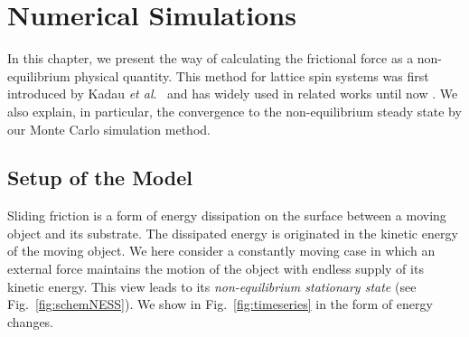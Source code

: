 \chapter{Numerical Simulations}\label{chap:NumSim}

In this chapter, we present the way of calculating the frictional force as a non-equilibrium physical quantity. This method for lattice spin systems was first introduced by Kadau \textit{et al}.\ \cite{Kadau2008} and has widely used in related works until now \cite{Hucht2009b,Magiera2011,Igloi2011,Hucht2012a,Angst2012,Li2016b}. We also explain, in particular, the convergence to the non-equilibrium steady state by our Monte Carlo simulation method.

\section{Setup of the Model}\label{sec:SetupModel}
Sliding friction is a form of energy dissipation on the surface between a moving object and its substrate. The dissipated energy is originated in the kinetic energy of the moving object. We here consider a constantly moving case in which an external force maintains the motion of the object with endless supply of its kinetic energy. This view leads to its \textit{non-equilibrium stationary state} (see Fig.~\ref{fig:schemNESS}). We show in Fig.~\ref{fig:timeseries} in the form of energy changes.
